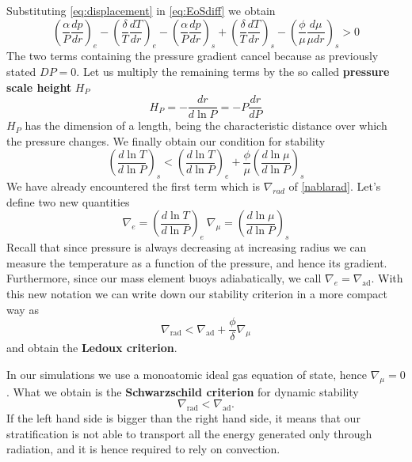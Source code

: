 Substituting \ref{eq:displacement} in \ref{eq:EoSdiff} we obtain
\begin{equation}
	\left (\frac{\alpha}{P} \frac{dp}{dr}\right )_e - \left ( \frac{\delta}{T}\frac{dT}{dr}\right )_e -  \left (\frac{\alpha}{P} \frac{dp}{dr}\right )_s +  \left ( \frac{\delta}{T}\frac{dT}{dr}\right )_s -  \left ( \frac{\phi}{\mu}\frac{d \mu}{\mu dr}\right )_s>0 
\end{equation}
The two terms containing the pressure gradient cancel because as previously stated $DP=0$. Let us multiply the remaining terms by the so called \textbf{pressure scale height} $H_P$
\begin{equation}\label{scaleheight}
	H_P=-\frac{dr}{d \ln P}= - P \frac{dr}{dP}
\end{equation}
$H_P$ has the dimension of a length, being the characteristic distance over which the pressure changes.
We finally obtain our condition for stability
\begin{equation}\label{criterionstab}
	\left (   \frac{d \ln T}{d \ln P}    \right )_s <  \left (   \frac{d \ln T}{d \ln P}   \right )_e +  \frac{\phi}{\mu} \left (   \frac{d \ln \mu}{d \ln P}    \right )_s
\end{equation}
We have already encountered the first term which is $\nabla_{rad}$ of \ref{nablarad}.
Let's define two new quantities
\begin{equation}\label{nablas}
	\nabla_{e} = \left (  \frac{d \ln T}{d \ln P}   \right )_e \  \nabla_{\mu} = \left (  \frac{d \ln \mu}{d \ln P}   \right )_s
\end{equation}
Recall that since pressure is always decreasing at increasing radius we can measure the temperature as a function of the pressure, and hence its gradient. Furthermore, since our mass element buoys adiabatically, we call $\nabla_e=\nabla_{\mathrm{ad}}$. 
With this new notation we can write down our stability criterion in a more compact way as
\begin{equation}\label{stabcritcomp}
	\nabla_{\mathrm{rad}} < \nabla_{\mathrm{ad}} + \frac{\phi}{\delta} \nabla_{\mu}
\end{equation}
and obtain the \textbf{Ledoux criterion}. 

In our simulations we use a monoatomic ideal gas equation of state, hence $\nabla_{\mu}=0$. What we obtain is the \textbf{Schwarzschild criterion} for dynamic stability
\begin{equation}\label{schwarzschild}
	\nabla_{\mathrm{rad}}<\nabla_{\mathrm{ad}}.
\end{equation}
If the left hand side is bigger than the right hand side, it means that our stratification is not able to transport all the energy generated only through radiation, and it is hence required to rely on convection. 

